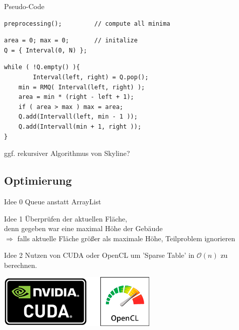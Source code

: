 \documentclass[11pt]{beamer}
\newcommand*{\Oh}{\mathcal{O}}
\begin{document}
\begin{frame}[fragile]
\begin{block}{Pseudo-Code}
\vspace{-3mm}
\begin{verbatim}
preprocessing();         // compute all minima
\end{verbatim}
\pause
\vspace{-7mm}
\begin{verbatim}
area = 0; max = 0;       // initalize
Q = { Interval(0, N) };
\end{verbatim}
\pause
\vspace{-7mm}
\begin{verbatim}
while ( !Q.empty() ){
		Interval(left, right) = Q.pop();
    min = RMQ( Interval(left, right) );
    area = min * (right - left + 1);
    if ( area > max ) max = area;
    Q.add(Intervall(left, min - 1 ));
    Q.add(Intervall(min + 1, right ));
}
\end{verbatim}
\end{block}
\end{frame}

\begin{frame}
ggf. rekursiver Algorithmus von Skyline?
\end{frame}

\subsection{Optimierung}

\begin{frame}
\begin{block}{Idee 0}
 Queue anstatt ArrayList
\end{block}
\pause
\begin{block}{Idee 1}
Überprüfen der aktuellen Fläche, \\
denn gegeben war eine maximal Höhe der Gebäude \\
$\Rightarrow$ falls aktuelle Fläche größer als maximale Höhe, Teilproblem ignorieren
\end{block}

\end{frame}

\begin{frame}

\begin{block}{Idee 2}
Nutzen von CUDA oder OpenCL um 'Sparse Table' in $\Oh(n)$ zu berechnen.

\includegraphics[width=0.2\linewidth]{picture/cuda_opencl_logos} 

\end{block} 

\end{frame}
\end{document}
